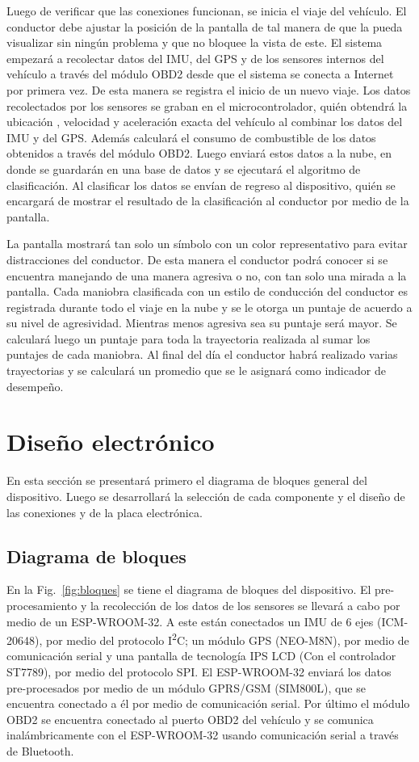Luego de verificar que las conexiones funcionan, se inicia el viaje del vehículo. El conductor debe ajustar la posición de la pantalla de tal manera de que la pueda visualizar sin ningún problema y que no bloquee la vista de este. El sistema empezará a recolectar datos del IMU, del GPS y de los sensores internos del vehículo a través del módulo OBD2 desde que el sistema se conecta a Internet por primera vez. De esta manera se registra el inicio de un nuevo viaje. Los datos recolectados por los sensores se graban en el microcontrolador, quién obtendrá la ubicación , velocidad y aceleración exacta del vehículo al combinar los datos del IMU y del GPS. Además calculará el consumo de combustible de los datos obtenidos a través del módulo OBD2. Luego enviará estos datos a la nube, en donde se guardarán en una base de datos y se ejecutará el algoritmo de clasificación. Al clasificar los datos se envían de regreso al dispositivo, quién se encargará de mostrar el resultado de la clasificación al conductor por medio de la pantalla.

La pantalla mostrará tan solo un símbolo con un color representativo para evitar distracciones del conductor. De esta manera el conductor podrá conocer si se encuentra manejando de una manera agresiva o no, con tan solo una mirada a la pantalla. Cada maniobra clasificada con un  estilo de conducción del conductor es registrada durante todo el viaje en la nube y se le otorga un puntaje de acuerdo a su nivel de agresividad. Mientras menos agresiva sea su puntaje será mayor. Se calculará luego un puntaje para toda la trayectoria realizada al sumar los puntajes de cada maniobra. Al final del día el conductor habrá realizado varias trayectorias y se calculará un promedio que se le asignará como indicador de desempeño.



\section{Diseño electrónico}
En esta sección se presentará primero el diagrama de bloques general del dispositivo. Luego se desarrollará la selección de cada componente y el diseño de las conexiones y de la placa electrónica.

\subsection{Diagrama de bloques}
En la Fig.~\ref{fig:bloques} se tiene el diagrama de bloques del dispositivo. El pre-procesamiento y la recolección de los datos de los sensores se llevará a cabo por medio de un ESP-WROOM-32. A este están conectados un IMU de 6 ejes (ICM-20648), por medio del protocolo I\textsuperscript{2}C; un módulo GPS (NEO-M8N), por medio de comunicación serial y una pantalla de tecnología IPS LCD (Con el controlador ST7789), por medio del protocolo SPI. El ESP-WROOM-32 enviará los datos pre-procesados por medio de un módulo GPRS/GSM (SIM800L), que se encuentra conectado a él por medio de comunicación serial. Por último el módulo OBD2 se encuentra conectado al puerto OBD2 del vehículo y se comunica inalámbricamente con el ESP-WROOM-32 usando comunicación serial a través de Bluetooth.

